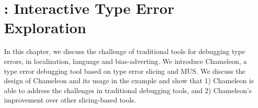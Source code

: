 \graphicspath{{Figures/Chameleon}}

\chapter{\chameleon{}: Interactive Type Error Exploration}


\label{chap:chameleon} 

In this chapter, we discuss the challenge of traditional tools for debugging type errors, in localization, language and bias-adverting. We introduce Chameleon, a type error debugging tool based on type error slicing and MUS. We discuss the design of Chameleon and its usage in the example and show that 1) Chameleon is able to address the challenges in traditional debugging tools, and 2) Chameleon's improvement over other slicing-based tools.








